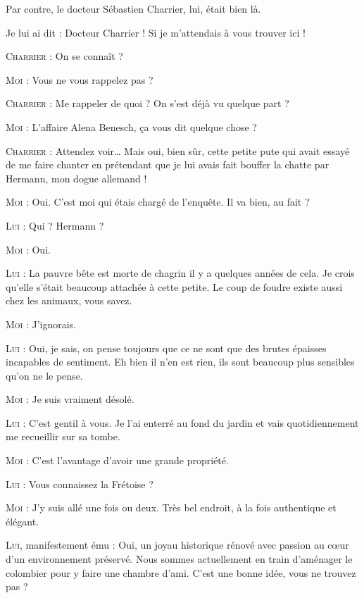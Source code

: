 
Par contre, le docteur Sébastien Charrier, lui, était bien là.

\begin{dialogue}

Je lui ai dit : Docteur Charrier ! Si je m’attendais à vous trouver ici !

\textsc{Charrier} : On se connaît ?

\textsc{Moi} : Vous ne vous rappelez pas ?

\textsc{Charrier} : Me rappeler de quoi ? On s’est déjà vu quelque part ?

\textsc{Moi} : L’affaire Alena Benesch, ça vous dit quelque chose ?

\textsc{Charrier} : Attendez voir… Mais oui, bien sûr, cette petite pute qui avait essayé de me faire chanter en prétendant que je lui avais fait bouffer la chatte par Hermann, mon dogue allemand !

\textsc{Moi} : Oui. C’est moi qui étais chargé de l’enquête. Il va bien, au fait ?

\textsc{Lui} : Qui ? Hermann ?

\textsc{Moi} : Oui.

\textsc{Lui} : La pauvre bête est morte de chagrin il y a quelques années de cela. Je crois qu’elle s’était beaucoup attachée à cette petite. Le coup de foudre existe aussi chez les animaux, vous savez.

\textsc{Moi} : J’ignorais.

\textsc{Lui} : Oui, je sais, on pense toujours que ce ne sont que des brutes épaisses incapables de sentiment. Eh bien il n’en est rien, ils sont beaucoup plus sensibles qu’on ne le pense.

\textsc{Moi} : Je suis vraiment désolé.

\textsc{Lui} : C’est gentil à vous. Je l’ai enterré au fond du jardin et vais quotidiennement me recueillir sur sa tombe.

\textsc{Moi} : C’est l’avantage d’avoir une grande propriété.

\textsc{Lui} : Vous connaissez la Frétoise ?

\textsc{Moi} : J’y suis allé une fois ou deux. Très bel endroit, à la fois authentique et élégant.

\textsc{Lui}, manifestement ému : Oui, un joyau historique rénové avec passion au cœur d’un environnement préservé. Nous sommes actuellement en train d’aménager le colombier pour y faire une chambre d’ami. C’est une bonne idée, vous ne trouvez pas ?


\end{dialogue}
